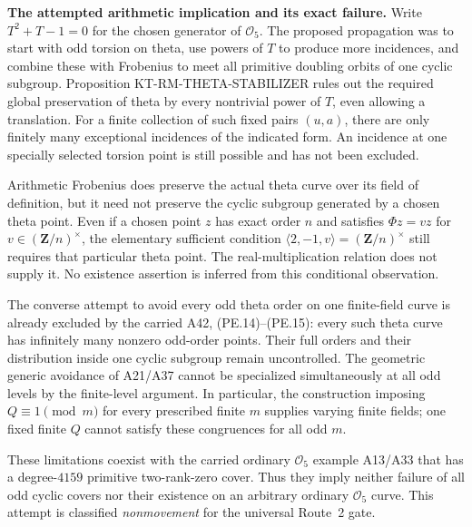\documentclass[11pt,a4paper]{article}
\theoremstyle{definition}
\renewcommand{\paragraph}[1]{\par\smallskip\noindent\textbf{#1}\quad\ignorespaces}
\begin{document}
\paragraph{The attempted arithmetic implication and its exact failure.}
Write $T^2+T-1=0$ for the chosen generator of $\mathcal O_5$.
The proposed propagation was to start with odd torsion on theta,
use powers of $T$ to produce more incidences, and combine these
with Frobenius to meet all primitive doubling orbits of one
cyclic subgroup.  Proposition KT-RM-THETA-STABILIZER rules out
the required global preservation of theta by every nontrivial
power of $T$, even allowing a translation.  For a finite collection
of such fixed pairs $(u,a)$, there are only finitely many exceptional
incidences of the indicated form.  An incidence at one specially
selected torsion point is still possible and has not been excluded.

Arithmetic Frobenius does preserve the actual theta curve over
its field of definition, but it need not preserve the cyclic
subgroup generated by a chosen theta point.  Even if a chosen
point $z$ has exact order $n$ and satisfies $\Phi z=vz$ for
$v\in(\mathbf Z/n)^\times$, the elementary sufficient condition
$\langle2,-1,v\rangle=(\mathbf Z/n)^\times$ still requires
that particular theta point.  The real-multiplication relation
does not supply it.  No existence assertion is inferred from
this conditional observation.

The converse attempt to avoid every odd theta order on one
finite-field curve is already excluded by the carried A42,
(PE.14)--(PE.15): every such theta curve has infinitely many
nonzero odd-order points.  Their full orders and their distribution
inside one cyclic subgroup remain uncontrolled.  The geometric
generic avoidance of A21/A37 cannot be specialized simultaneously
at all odd levels by the finite-level argument.  In particular,
the construction imposing $Q\equiv1\pmod m$ for every prescribed
finite $m$ supplies varying finite fields; one fixed finite
$Q$ cannot satisfy these congruences for all odd $m$.

These limitations coexist with the carried ordinary
$\mathcal O_5$ example A13/A33 that has a degree-$4159$
primitive two-rank-zero cover.  Thus they imply neither failure
of all odd cyclic covers nor their existence on an arbitrary
ordinary $\mathcal O_5$ curve.  This attempt is classified
\emph{nonmovement} for the universal Route~2 gate.
\end{document}
